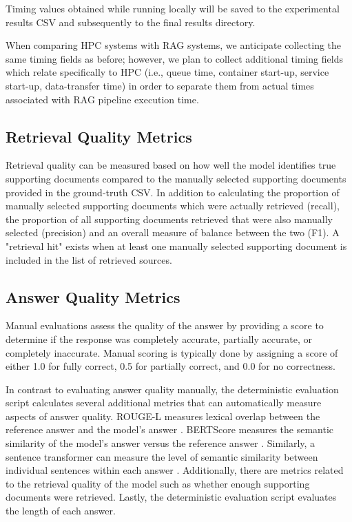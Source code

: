 Timing values obtained while running locally will be saved to the experimental results CSV and subsequently to the final results directory.


When comparing HPC systems with RAG systems, we anticipate collecting the same timing fields as before; however, we plan to collect additional timing fields which relate specifically to HPC (i.e., queue time, container start-up, service start-up, data-transfer time) in order to separate them from actual times associated with RAG pipeline execution time.

\subsection{Retrieval Quality Metrics}
Retrieval quality can be measured based on how well the model identifies true supporting documents compared to the manually selected supporting documents provided in the ground-truth CSV. In addition to calculating the proportion of manually selected supporting documents which were actually retrieved (recall), the proportion of all supporting documents retrieved that were also manually selected (precision) and an overall measure of balance between the two (F1). A "retrieval hit" exists when at least one manually selected supporting document is included in the list of retrieved sources.

\subsection{Answer Quality Metrics}
Manual evaluations assess the quality of the answer by providing a score to determine if the response was completely accurate, partially accurate, or completely inaccurate. Manual scoring is typically done by assigning a score of either 1.0 for fully correct, 0.5 for partially correct, and 0.0 for no correctness. 

In contrast to evaluating answer quality manually, the deterministic evaluation script calculates several additional metrics that can automatically measure aspects of answer quality. \ac{ROUGE-L} measures lexical overlap between the reference answer and the model's answer \cite{lin2004rouge}. \ac{BERTScore} measures the semantic similarity of the model's answer versus the reference answer \cite{zhang2020bertscore}. Similarly, a sentence transformer can measure the level of semantic similarity between individual sentences within each answer \cite{reimers2019sentencebert}. Additionally, there are metrics related to the retrieval quality of the model such as whether enough supporting documents were retrieved. Lastly, the deterministic evaluation script evaluates the length of each answer.


